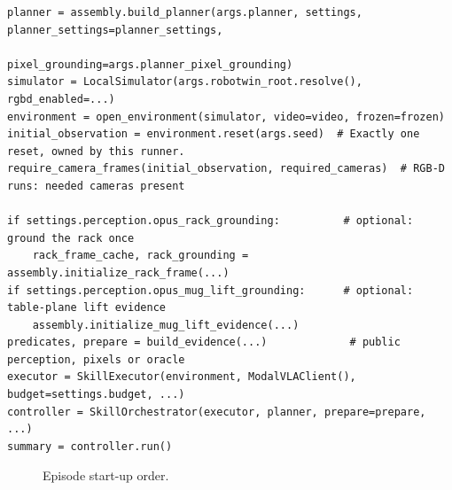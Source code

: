 \documentclass[11pt,a4paper]{article}
\newcommand{\code}[1]{\texttt{\detokenize{#1}}}
\newcommand{\srcref}[1]{{\small\color{stone}\faCode\ \texttt{\detokenize{#1}}}}
\begin{document}
\begin{lstlisting}[numbers=none,caption={\srcref{run_skills.py:200} \ \code{run_episode} (abridged)}]
planner = assembly.build_planner(args.planner, settings, planner_settings=planner_settings,
                                 pixel_grounding=args.planner_pixel_grounding)
simulator = LocalSimulator(args.robotwin_root.resolve(), rgbd_enabled=...)
environment = open_environment(simulator, video=video, frozen=frozen)
initial_observation = environment.reset(args.seed)  # Exactly one reset, owned by this runner.
require_camera_frames(initial_observation, required_cameras)  # RGB-D runs: needed cameras present

if settings.perception.opus_rack_grounding:          # optional: ground the rack once
    rack_frame_cache, rack_grounding = assembly.initialize_rack_frame(...)
if settings.perception.opus_mug_lift_grounding:      # optional: table-plane lift evidence
    assembly.initialize_mug_lift_evidence(...)
predicates, prepare = build_evidence(...)             # public perception, pixels or oracle
executor = SkillExecutor(environment, ModalVLAClient(), budget=settings.budget, ...)
controller = SkillOrchestrator(executor, planner, prepare=prepare, ...)
summary = controller.run()
\end{lstlisting}

\begin{figure}[H]
\centering
{}
\caption{Episode start-up order.}
\end{figure}
\end{document}
